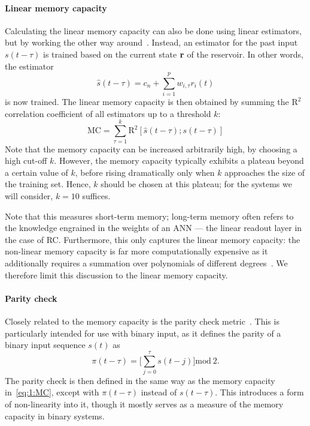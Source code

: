 \paragraph{Linear memory capacity}
Calculating the linear memory capacity can also be done using linear estimators, but by working the other way around~\cite{tsunegi2019STOforcedsyncRC,NeuromorphicFewShot}.
Instead, an estimator for the past input $s(t - \tau)$ is trained based on the current state $\boldsymbol{\mathbf{r}}$ of the reservoir.
In other words, the estimator
\begin{equation}
	\hat{s}(t - \tau) = c_n + \sum_{i=1}^{p} w_{i,\tau} r_i(t)
\end{equation}
is now trained.
The linear memory capacity is then obtained by summing the $\mathrm{R}^2$ correlation coefficient of all estimators up to a threshold $k$:
\begin{equation}
	\label{eq:1:MC}
	\mathrm{MC} = \sum_{\tau = 1}^{k} \mathrm{R}^2[\hat{s}(t - \tau); s(t - \tau)]
\end{equation}
Note that the memory capacity can be increased arbitrarily high, by choosing a high cut-off $k$.
However, the memory capacity typically exhibits a plateau beyond a certain value of $k$, before rising dramatically only when $k$ approaches the size of the training set.
Hence, $k$ should be chosen at this plateau; for the systems we will consider, $k=10$ suffices. \par
Note that this measures short-term memory; long-term memory often refers to the knowledge engrained in the weights of an ANN --- the linear readout layer in the case of RC.
Furthermore, this only captures the linear memory capacity: the non-linear memory capacity is far more computationally expensive as it additionally requires a summation over polynomials of different degrees~\cite{RCbenchmarksReview1}.
We therefore limit this discussion to the linear memory capacity.

\paragraph{Parity check}
Closely related to the memory capacity is the parity check metric~\cite{hon2021numerical,tsunegi2019STOforcedsyncRC}.
This is particularly intended for use with binary input, as it defines the parity of a binary input sequence $s(t)$ as
\begin{equation}
	\pi(t-\tau) = \Bigg[\sum_{j = 0}^{\tau} s(t - j) \Bigg] \mathrm{mod}~2 \mathrm{.}
\end{equation}
The parity check is then defined in the same way as the memory capacity in~\cref{eq:1:MC}, except with $\pi(t - \tau)$ instead of $s(t - \tau)$.
This introduces a form of non-linearity into it, though it mostly serves as a measure of the memory capacity in binary systems. %

